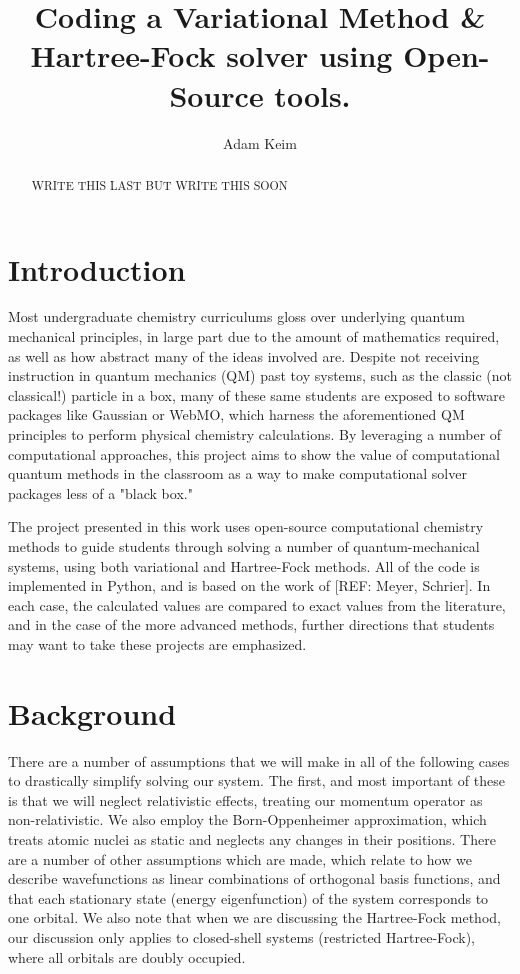 \documentclass[journal=jacsat,manuscript=communication]{achemso}
\title{Coding a Variational Method \& Hartree-Fock solver using Open-Source tools.}
\author{Adam Keim}
\begin{document}
\begin{abstract}
WRITE THIS LAST BUT WRITE THIS SOON 
\end{abstract}
\section{Introduction}
Most undergraduate chemistry curriculums gloss over underlying quantum mechanical principles, in large part due to the amount of mathematics required, as well as how abstract many of the ideas involved are. Despite not receiving instruction in quantum mechanics (QM) past toy systems, such as the classic (not classical!) particle in a box, many of these same students are exposed to software packages like Gaussian or WebMO, which harness the aforementioned QM principles to perform physical chemistry calculations.  By leveraging a number of computational approaches, this project aims to show the value of computational quantum methods in the classroom as a way to make computational solver packages less of a "black box."

The project presented in this work uses open-source computational chemistry methods to guide students through solving a number of quantum-mechanical systems, using both variational and Hartree-Fock methods.  All of the code is implemented in Python, and is based on the work of [REF: Meyer, Schrier].  In each case, the calculated values are compared to exact values from the literature, and in the case of the more advanced methods, further directions that students may want to take these projects are emphasized.


\section{Background}
There are a number of assumptions that we will make in all of the following cases to drastically simplify solving our system.  The first, and most important of these is that we will neglect relativistic effects, treating our momentum operator as non-relativistic.  We also employ the Born-Oppenheimer approximation, which treats atomic nuclei as static and neglects any changes in their positions.  There are a number of other assumptions which are made, which relate to how we describe wavefunctions as linear combinations of orthogonal basis functions, and that each stationary state (energy eigenfunction) of the system corresponds to one orbital.  We also note that when we are discussing the Hartree-Fock method, our discussion only applies to closed-shell systems (restricted Hartree-Fock), where all orbitals are doubly occupied. 
\end{document}
